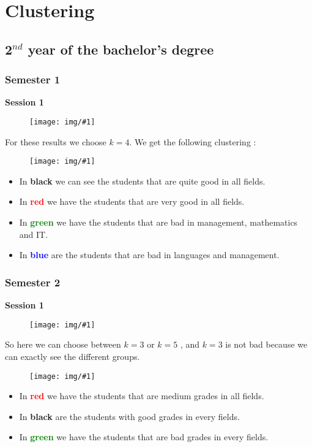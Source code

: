 \documentclass[11pt, a4paper]{article}
\newcommand\image[2]{
	\begin{figure}[H]
	\centering
	\texttt{[image: img/\#1]}
	\end{figure}
}
\begin{document}
    \newpage

    \section{Clustering}

    \subsection{2$^{nd}$ year of the bachelor's degree}

    \subsubsection{Semester 1}

    \textbf{\large{Session 1}}

    \image{image07.png}{300px}

    For these results we choose $k=4$.
    \newpage
    We get the following clustering :
    \image{image18.png}{\textwidth}

    \begin{itemize}
        \item In \textbf{black} we can see the students that are quite good in all fields.
        \item In \textbf{\textcolor{red}{red}} we have the students that are very good in all fields.
        \item In \textbf{\textcolor{green}{green}} we have the students that are bad in management, mathematics and IT.
        \item In \textbf{\textcolor{blue}{blue}} are the students that are bad in languages and management.
    \end{itemize}

    \newpage

    \subsubsection{Semester 2}

    \textbf{\large{Session 1}}

    \image{image15.png}{250px}
    So here we can choose between $k=3$ or $k=5$ , and $k=3$ is not bad because we can exactly see the different groups.
   
    \image{image16.png}{350px}
        
     \begin{itemize}
        \item In \textbf{\textcolor{red}{red}} we have the students that are medium grades in all fields.
        \item In \textbf{black} are the students with good grades in every fields.
        \item In \textbf{\textcolor{green}{green}} we have the students that are bad grades in every fields.
    \end{itemize}
    
\end{document}

